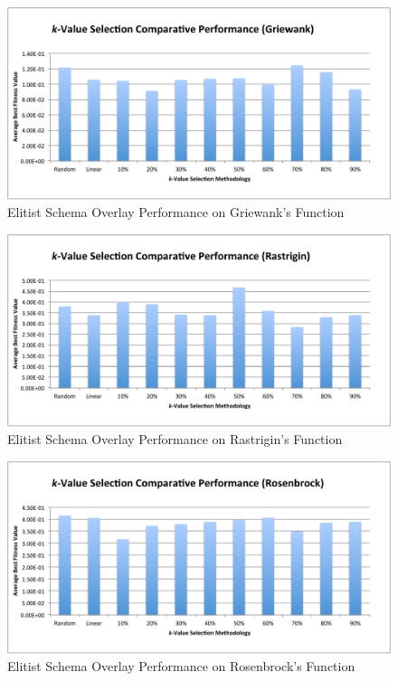 \begin{figure}[htbp!]
\centering
\includegraphics[scale=0.60]{charts/ESO_Griewank.pdf}
\caption{Elitist Schema Overlay Performance on Griewank's Function}
\label{fig:eso_griewank}
\end{figure}

\begin{figure}[htbp!]
\centering
\includegraphics[scale=0.60]{charts/ESO_Rastrigin.pdf}
\caption{Elitist Schema Overlay Performance on Rastrigin's Function}
\label{fig:eso_rastrigin}
\end{figure}

\begin{figure}[htbp!]
\centering
\includegraphics[scale=0.60]{charts/ESO_Rosenbrock.pdf}
\caption{Elitist Schema Overlay Performance on Rosenbrock's Function}
\label{fig:eso_rosenbrock}
\end{figure}

